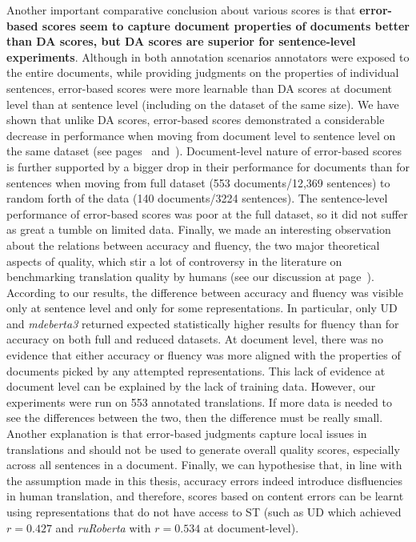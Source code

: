 Another important comparative conclusion about various scores is that \textbf{error-based scores seem to capture document properties of documents better than DA scores, but DA scores are superior for sentence-level experiments}. 
Although in both annotation scenarios annotators were exposed to the entire documents, while providing judgments on the properties of individual sentences, error-based scores were more learnable than DA scores at document level than at sentence level (including on the dataset of the same size). We have shown that unlike DA scores, error-based scores demonstrated a considerable decrease in performance when moving from document level to sentence level on the same dataset (see pages~\pageref{pg:downward_slide} and~\pageref{pg:no_slide_for_da_when_moving_to_sent}). 
Document-level nature of error-based scores is further supported by a bigger drop in their performance for documents than for sentences when moving from full dataset (553 documents/12,369 sentences) to random forth of the data (140 documents/3224 sentences). The sentence-level performance of error-based scores was poor at the full dataset, so it did not suffer as great a tumble on limited data.
Finally, we made an interesting observation about the relations between accuracy and fluency, the two major theoretical aspects of quality, which stir a lot of controversy in the literature on benchmarking translation quality by humans (see our discussion at page~\pageref{pg:controvercy_over_acc_and_flu}).
According to our results, the difference between accuracy and fluency was visible only at sentence level and only for some representations. In particular, only UD and \textit{mdeberta3} returned expected statistically higher results for fluency than for accuracy on both full and reduced datasets. %
At document level, there was no evidence that either accuracy or fluency was more aligned with the properties of documents picked by any attempted representations. 
This lack of evidence at document level can be explained by the lack of training data. 
However, our experiments were run on 553 annotated translations. If more data is needed to see the differences between the two, then the difference must be really small. Another explanation is that error-based judgments capture local issues in translations and should not be used to generate overall quality scores, especially across all sentences in a document. Finally, we can hypothesise that, in line with the assumption made in this thesis, accuracy errors indeed introduce disfluencies in human translation, and therefore, scores based on content errors can be learnt using representations that do not have access to ST (such as UD which achieved $r=0.427$ and \textit{ruRoberta} with $r=0.534$ at document-level).

